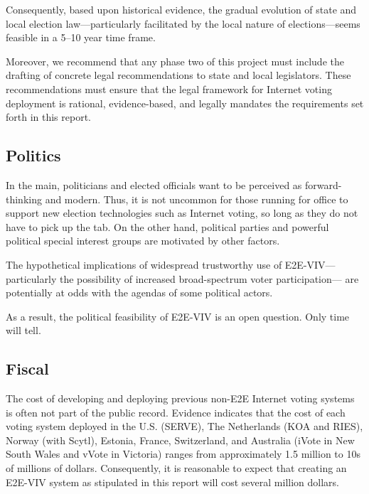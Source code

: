 Consequently, based upon historical evidence, the gradual evolution of
state and local election law---particularly facilitated by the local
nature of elections---seems feasible in a 5--10 year time frame.

Moreover, we recommend that any phase two of this project must include
the drafting of concrete legal recommendations to state and local
legislators.  These recommendations must ensure that the legal
framework for Internet voting deployment is rational, evidence-based,
and legally mandates the requirements set forth in this report.

\subsection{Politics}

In the main, politicians and elected officials want to be perceived as
forward-thinking and modern.  Thus, it is not uncommon for those
running for office to support new election technologies such as
Internet voting, so long as they do not have to pick up the tab.  On
the other hand, political parties and powerful political special
interest groups are motivated by other factors.

The hypothetical implications of widespread trustworthy use of
E2E-VIV---particularly the possibility of increased broad-spectrum
voter participation--- are potentially at odds with the agendas of
some political actors.

As a result, the political feasibility of E2E-VIV is an open question.
Only time will tell.

\subsection{Fiscal}
\label{sec:fiscal}

The cost of developing and deploying previous non-E2E Internet voting
systems is often not part of the public record.  Evidence indicates
that the cost of each voting system deployed in the U.S. (SERVE), The
Netherlands (KOA and RIES), Norway (with Scytl), Estonia, France,
Switzerland, and Australia (iVote in New South Wales and vVote in
Victoria) ranges from approximately 1.5 million to 10s of millions of
dollars. Consequently, it is reasonable to expect that creating an
E2E-VIV system as stipulated in this report will cost several million
dollars.

